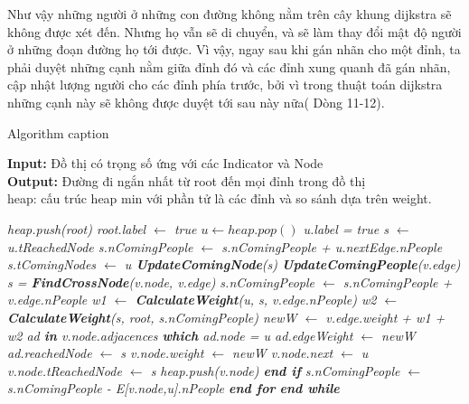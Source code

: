     Như vậy những người ở những con đường không nằm trên cây khung dijkstra sẽ không
    được xét đến. Nhưng họ vẫn sẽ di chuyển, và sẽ làm thay đổi mật độ người ở những
    đoạn đường họ tới được. Vì vậy, ngay sau khi gán nhãn cho một đỉnh, ta phải 
    duyệt những cạnh nằm giữa đỉnh đó và các đỉnh xung quanh đã gán nhãn, cập nhật 
    lượng người cho các đỉnh phía trước, bởi vì trong thuật toán dijkstra những cạnh 
    này sẽ không được duyệt tới sau này nữa( Dòng 11-12).
    \begin{algorithm}[H]
    \caption{Algorithm caption}
    \label{alg:algorithm-label}
    \textbf{Input:} Đồ thị có trọng số ứng với các Indicator và Node\\
    \textbf{Output:} Đường đi ngắn nhất từ root đến mọi đỉnh trong đồ thị\\
    heap: cấu trúc heap min với phần tử là các đỉnh và so sánh dựa 
    trên weight.
    \begin{algorithmic}[1]
        \em
        \State heap.push(root)
        \State root.label $\gets$ true
        \State $u \gets heap.pop()$
        \State u.label = true
        \State s $\gets$ u.tReachedNode
        \State s.nComingPeople $\gets$ s.nComingPeople + u.nextEdge.nPeople
        \State s.tComingNodes $\gets$ u
        \State \textbf{UpdateComingNode}(s)
        \State \textbf{UpdateComingPeople}(v.edge)
        \EndFor
        \State s = \textbf{FindCrossNode}(v.node, v.edge)
        \State s.nComingPeople $\gets$ s.nComingPeople + v.edge.nPeople
        \State w1 $\gets$ \textbf{CalculateWeight}(u, s, v.edge.nPeople)
        \State w2 $\gets$ \textbf{CalculateWeight}(s, root, s.nComingPeople)
        \State newW $\gets$ v.edge.weight + w1 + w2
        \State ad \textbf{in} v.node.adjacences \textbf{which} ad.node = u
        \State ad.edgeWeight $\gets$ newW
        \State ad.reachedNode $\gets$ s
        \State v.node.weight $\gets$ newW
        \State v.node.next $\gets$ u 
        \State v.node.tReachedNode $\gets$ s
        \State heap.push(v.node)
        \EndIf
        \State \textbf{end if}
        \State s.nComingPeople $\gets$ s.nComingPeople - E[v.node,u].nPeople
        \EndFor
        \textbf{end for}
        \EndWhile
        \textbf{end while}
    \EndProcedure
    \end{algorithmic}
    \end{algorithm}
